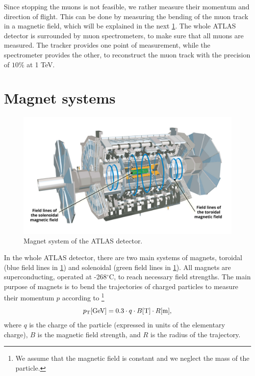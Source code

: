 Since stopping the muons is not feasible, we rather measure their momentum and direction of flight.
This can be done by measuring the bending of the muon track in a magnetic field, which will be explained in the next \cref{sec:magnet}.
The whole ATLAS detector is surrounded by muon spectrometers, to make sure that all muons are measured.
The tracker provides one point of measurement, while the spectrometer provides the other, to reconstruct the muon track with the precision of $10\%$ at 1 TeV.


\section{Magnet systems}
\label{sec:magnet}
\begin{figure}[htb]
    \centering
    \includegraphics[width=1\linewidth]{src/img/magnet.jpg}
    \caption{Magnet system of the ATLAS detector.}
    \label{fig:magnet}
\end{figure}

In the whole ATLAS detector, there are two main systems of magnets, toroidal (blue field lines in \cref{fig:magnet}) and solenoidal (green field lines in \cref{fig:magnet}).
All magnets are superconducting, operated at -268$^\circ$C, to reach necessary field strengths.
The main purpose of magnets is to bend the trajectories of charged particles to measure their momentum $p$ according to \footnote{We assume that the magnetic field is constant and we neglect the mass of the particle.}
\begin{equation}
    \label{eq:magnet_momentum}
    p_\text{T} [\text{GeV}] = 0.3 \cdot q \cdot B [\text{T}] \cdot R [\text{m}],
\end{equation} 
where $q$ is the charge of the particle (expressed in units of the elementary charge), $B$ is the magnetic field strength, and $R$ is the radius of the trajectory.

